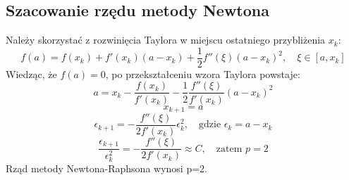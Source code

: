 \documentclass{article}
\begin{document}
\subsection{Szacowanie rzędu metody Newtona}
Należy skorzystać z rozwinięcia Taylora w miejscu ostatniego przybliżenia $x_k$:
\begin{equation*}
f(a) = f(x_k) + f'(x_k)(a - x_k) + \frac{1}{2}f''(\xi)(a - x_k)^2, \quad \xi \in [a, x_k]
\end{equation*}
Wiedząc, że $f(a)=0$, po przekształceniu wzora Taylora powstaje:
\begin{equation*}
a = x_k - \frac{f(x_k)}{f'(x_k)} - \frac{1}{2} \frac{f''(\xi)}{f'(x_k)} (a - x_k)^2
\end{equation*}
\begin{equation*}
    x_{k+1} = a
\end{equation*}
\begin{equation*}
\epsilon_{k+1} = -\frac{f''(\xi)}{2f'(x_k)} \epsilon_k^2, \quad \text{gdzie } \epsilon_k = a - x_k
\end{equation*}
\begin{equation*}
\frac{\epsilon_{k+1}}{\epsilon_k^2} = -\frac{f''(\xi)}{2f'(x_k)} \approx C, \quad \text{zatem } p = 2
\end{equation*}
\noindent
Rząd metody Newtona-Raphsona wynosi p=2.
\end{document}

